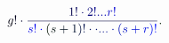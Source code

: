 \documentclass[12pt]{article}
\begin{document}
\makeatletter
\renewcommand*{\@textcolor}[3]{%
  \protect\leavevmode
  \begingroup
    \color#1{#2}#3%
  \endgroup
}
\makeatother
\begin{displaymath}
\mathcolor[RGB]{0,0,15}{g} \mathcolor[RGB]{0,0,30}{!} \mathcolor[RGB]{0,0,45}{\cdot} \mathcolor[RGB]{0,0,60}{\frac { \mathcolor[RGB]{0,0,75}{1} \mathcolor[RGB]{0,0,90}{!} \mathcolor[RGB]{0,0,105}{\cdot} \mathcolor[RGB]{0,0,120}{2} \mathcolor[RGB]{0,0,135}{!} \mathcolor[RGB]{0,0,150}{.} \mathcolor[RGB]{0,0,165}{.} \mathcolor[RGB]{0,0,180}{.} \mathcolor[RGB]{0,0,195}{r} \mathcolor[RGB]{0,0,210}{!} } { \mathcolor[RGB]{0,0,225}{s} \mathcolor[RGB]{0,0,240}{!} \mathcolor[RGB]{0,0,255}{\cdot} \mathcolor[RGB]{0,15,0}{(} \mathcolor[RGB]{0,15,15}{s} \mathcolor[RGB]{0,15,30}{+} \mathcolor[RGB]{0,15,45}{1} \mathcolor[RGB]{0,15,60}{)} \mathcolor[RGB]{0,15,75}{!} \mathcolor[RGB]{0,15,90}{\cdot} \mathcolor[RGB]{0,15,105}{\cdot} \mathcolor[RGB]{0,15,120}{.} \mathcolor[RGB]{0,15,135}{.} \mathcolor[RGB]{0,15,150}{.} \mathcolor[RGB]{0,15,165}{\cdot} \mathcolor[RGB]{0,15,180}{(} \mathcolor[RGB]{0,15,195}{s} \mathcolor[RGB]{0,15,210}{+} \mathcolor[RGB]{0,15,225}{r} \mathcolor[RGB]{0,15,240}{)} \mathcolor[RGB]{0,15,255}{!} } } \mathcolor[RGB]{0,30,0}{.}
\end{displaymath}
\end{document}
